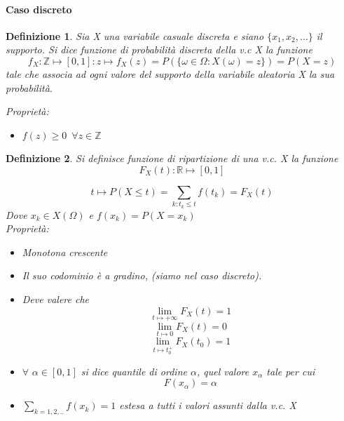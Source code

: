 \documentclass{article}
\newtheorem{definition}{Definizione}[section]
\begin{document}
                     \paragraph{Caso discreto}
                     \begin{definition}{} Sia X una variabile casuale discreta e siano $\{x_1 ,x_2 ,...\}$ il supporto. 
                     Si dice funzione di probabilità discreta della v.c X la funzione
                         $$
                            f_X\colon \mathbb{Z} \mapsto [0,1]:  z \longmapsto f_X(z) = P(\{\omega \in \Omega : X(\omega) =z\}) = P(X=z)
                         $$
                          tale che associa ad ogni valore del supporto della variabile aleatoria X la sua probabilità.
                    
                    Proprietà: 
                        \begin{itemize}
                            \item $f(z) \geq 0 \,\,\, \forall z \in \mathbb{Z} $
                        \end{itemize}{}
                  \end{definition}        
                 
                  \begin{definition}{} 
                     Si definisce funzione di ripartizione di una v.c. X la funzione
                     $$
                        F_X(t) \colon \mathbb{R} \mapsto [0,1]
                     $$
                     
                     $$ 
                        t\longmapsto P(X\leq t) = \sum_{k : t_k \leq t} f(t_k)  = F_X(t)
                     $$
                     Dove $x_k\in X(\Omega)$ e $f(x_k)= P(X=x_k)$\\
                     
                     \bigbreak
                     Proprietà: 
                     \begin{itemize}{}
                         \item Monotona crescente
                         \item Il suo codominio è a gradino, (siamo nel caso discreto). 
                        \item Deve valere che
                                $$\lim_{t\mapsto +\infty}  F_X(t)=1 $$  $$\lim_{t\mapsto 0}  F_X(t)=0 $$
                                $$\lim_{t\mapsto t_0^+}  F_X(t_0)=1$$
                         \item $\forall\,\, \alpha \in [0,1] $ si dice quantile di ordine $\alpha$, quel valore $x_{\alpha}$ tale per cui 
                         $$ 
                            F(x_{\alpha}) = \alpha
                         $$
                         \item $\sum_{k=1,2,..} f(x_k) = 1$ estesa a tutti i valori assunti dalla v.c. X
                     \end{itemize}{}
                    
                   \end{definition}  
                 
\end{document}
